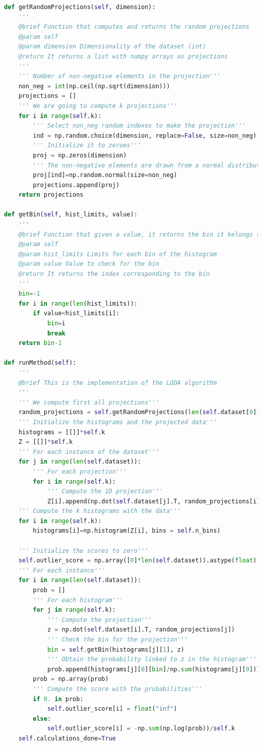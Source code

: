 \begin{lstlisting}[language=Python]
def getRandomProjections(self, dimension):
	'''
	@brief Function that computes and returns the random projections
	@param self
	@param dimension Dimensionality of the dataset (int)
	@return It returns a list with numpy arrays as projections
	'''
	''' Number of non-negative elements in the projection'''
	non_neg = int(np.ceil(np.sqrt(dimension)))
	projections = []
	''' We are going to compute k projections'''
	for i in range(self.k):
		''' Select non_neg random indexes to make the projection'''
		ind = np.random.choice(dimension, replace=False, size=non_neg)
		''' Initialize it to zeroes'''
		proj = np.zeros(dimension)
		''' The non-negative elements are drawn from a normal distribution'''
		proj[ind]=np.random.normal(size=non_neg)
		projections.append(proj)
	return projections

def getBin(self, hist_limits, value):
	'''
	@brief Function that given a value, it returns the bin it belongs to for the histogram
	@param self
	@param hist_limits Limits for each bin of the histogram
	@param value Value to check for the bin
	@return It returns the index corresponding to the bin
	'''
	bin=-1
	for i in range(len(hist_limits)):
		if value<hist_limits[i]:
			bin=i
			break
	return bin-1

def runMethod(self):
	'''
	@brief This is the implementation of the LODA algorithm
	'''
	''' We compute first all projections'''
	random_projections = self.getRandomProjections(len(self.dataset[0]))
	''' Initialize the histograms and the projected data'''
	histograms = [[]]*self.k
	Z = [[]]*self.k
	''' For each instance of the dataset'''
	for j in range(len(self.dataset)):
		''' For each projection'''
		for i in range(self.k):
			''' Compute the 1D projection'''
			Z[i].append(np.dot(self.dataset[j].T, random_projections[i]))
	''' Compute the k histograms with the data'''
	for i in range(self.k):
		histograms[i]=np.histogram(Z[i], bins = self.n_bins)
	
	''' Initialize the scores to zero'''
	self.outlier_score = np.array([0]*len(self.dataset)).astype(float)
	''' For each instance'''
	for i in range(len(self.dataset)):
		prob = []
		''' For each histogram'''
		for j in range(self.k):
			''' Compute the projection'''
			z = np.dot(self.dataset[i].T, random_projections[j])
			''' Check the bin for the projection'''
			bin = self.getBin(histograms[j][1], z)
			''' Obtain the probability linked to z in the histogram'''
			prob.append(histograms[j][0][bin]/np.sum(histograms[j][0]))
		prob = np.array(prob)
		''' Compute the score with the probabilities'''
		if 0. in prob:
			self.outlier_score[i] = float("inf")
		else:
			self.outlier_score[i] = -np.sum(np.log(prob))/self.k
	self.calculations_done=True
\end{lstlisting}

